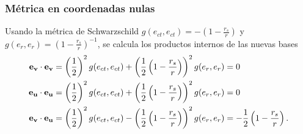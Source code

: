 \subsubsection{Métrica en coordenadas nulas}

Usando la métrica de Schwarzschild \( g(e_{ct},e_{ct}) = -\left(1-\frac{r_s}{r}\right) \) y \( g(e_r,e_r) = \left(1-\frac{r_s}{r}\right)^{-1} \), se calcula los productos internos de las nuevas bases
\begin{equation}
    \begin{aligned}
       \mathbf{ e_v }\cdot \mathbf{e_v} & = \left(\frac{1}{2}\right)^2 g(e_{ct},e_{ct}) + \left(\frac{1}{2}\left(1-\frac{r_s}{r}\right)\right)^2 g(e_r,e_r) = 0                                        \\
        \mathbf{ e_u }\cdot \mathbf{e_u} & = \left(\frac{1}{2}\right)^2 g(e_{ct},e_{ct}) + \left(\frac{1}{2}\left(1-\frac{r_s}{r}\right)\right)^2 g(e_r,e_r) = 0                                        \\
        \mathbf{ e_v }\cdot \mathbf{e_u} & = \left(\frac{1}{2}\right)^2 g(e_{ct},e_{ct}) - \left(\frac{1}{2}\left(1-\frac{r_s}{r}\right)\right)^2 g(e_r,e_r) = -\frac{1}{2}\left(1-\frac{r_s}{r}\right).
    \end{aligned}
\end{equation}
